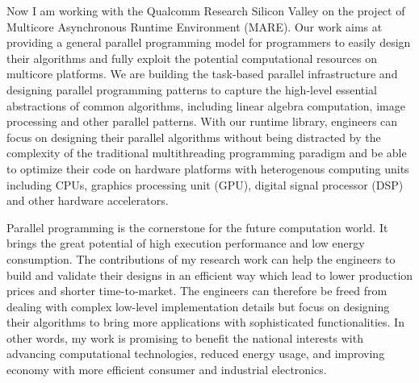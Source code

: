 \bigskip
Now I am working with the Qualcomm Research Silicon Valley on the project of Multicore Asynchronous Runtime Environment (MARE). Our work aims at providing a general parallel programming model for programmers to easily design their algorithms and fully exploit the potential computational resources on multicore platforms. We are building the task-based parallel infrastructure and designing parallel programming patterns to capture the high-level essential abstractions of common algorithms, including linear algebra computation, image processing and other parallel patterns. With our runtime library, engineers can focus on designing their parallel algorithms without being distracted by the complexity of the traditional multithreading programming paradigm and be able to optimize their code on hardware platforms with heterogenous computing units including CPUs, graphics processing unit (GPU), digital signal processor (DSP) and other hardware accelerators. 

\bigskip
Parallel programming is the cornerstone for the future computation world. It brings the great potential of high execution performance and low energy consumption. The contributions of my research work can help the engineers to build and validate their designs in an efficient way which lead to lower production prices and shorter time-to-market. The engineers can therefore be freed from dealing with complex low-level implementation details but focus on designing their algorithms to bring more applications with sophisticated functionalities. In other words, my work is promising to benefit the national interests with advancing computational technologies, reduced energy usage, and improving economy with more efficient consumer and industrial electronics. 


